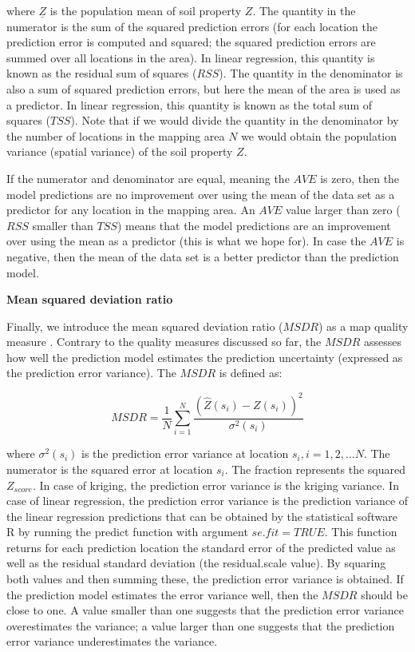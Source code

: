 \documentclass[10pt,b5paper,]{book}
\theoremstyle{definition}
\theoremstyle{definition}
\theoremstyle{definition}
\theoremstyle{remark}
\begin{document}
where \({\underline{Z}}\) is the population mean of soil property \(Z\).
The quantity in the numerator is the sum of the squared prediction
errors (for each location the prediction error is computed and squared;
the squared prediction errors are summed over all locations in the
area). In linear regression, this quantity is known as the residual sum
of squares (\({RSS}\)). The quantity in the denominator is also a sum of
squared prediction errors, but here the mean of the area is used as a
predictor. In linear regression, this quantity is known as the total sum
of squares (\({TSS}\)). Note that if we would divide the quantity in the
denominator by the number of locations in the mapping area \(N\) we
would obtain the population variance (spatial variance) of the soil
property \(Z\).

If the numerator and denominator are equal, meaning the \({AVE}\) is
zero, then the model predictions are no improvement over using the mean
of the data set as a predictor for any location in the mapping area. An
\({AVE}\) value larger than zero (\({RSS}\) smaller than \({TSS}\))
means that the model predictions are an improvement over using the mean
as a predictor (this is what we hope for). In case the \({AVE}\) is
negative, then the mean of the data set is a better predictor than the
prediction model.

\textbf{Mean squared deviation ratio}

Finally, we introduce the mean squared deviation ratio (\({MSDR}\)) as a
map quality measure
\citep{kempen2010pedometric, lark2000comparison, voltz1990comparison, webster_2007}.
Contrary to the quality measures discussed so far, the \({MSDR}\)
assesses how well the prediction model estimates the prediction
uncertainty (expressed as the prediction error variance). The \({MSDR}\)
is defined as:

\begin{equation}
M S D R = \frac{1}{N} \sum_{i=1}^{N} \frac{(\hat{Z}(s_i) - Z(s_i))^2}{\sigma^2(s_i)}
\end{equation}

where \({\sigma^2(s_i)}\) is the prediction error variance at location
\({s_i, i = 1, 2, \dots N}\). The numerator is the squared error at
location \({s_i}\). The fraction represents the squared \({Z_{score}}\).
In case of kriging, the prediction error variance is the kriging
variance. In case of linear regression, the prediction error variance is
the prediction variance of the linear regression predictions that can be
obtained by the statistical software R by running the predict function
with argument \({se.fit = TRUE}\). This function returns for each
prediction location the standard error of the predicted value as well as
the residual standard deviation (the residual.scale value). By squaring
both values and then summing these, the prediction error variance is
obtained. If the prediction model estimates the error variance well,
then the \({MSDR}\) should be close to one. A value smaller than one
suggests that the prediction error variance overestimates the variance;
a value larger than one suggests that the prediction error variance
underestimates the variance.
\end{document}
